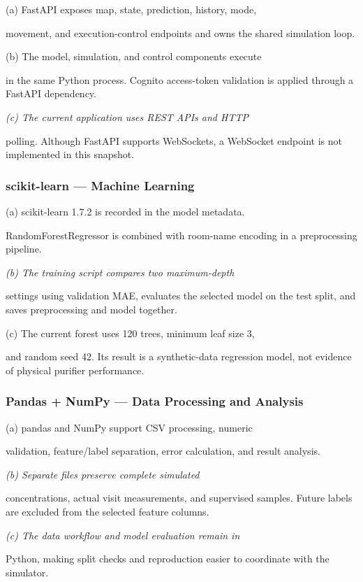 \documentclass[conference]{IEEEtran}
\begin{document}
(a) FastAPI exposes map, state, prediction, history, mode,

movement, and execution-control endpoints and owns the shared simulation loop.

(b) The model, simulation, and control components execute

in the same Python process. Cognito access-token validation is applied through a FastAPI dependency.

\emph{(c) The current application uses REST APIs and HTTP}

polling. Although FastAPI supports WebSockets, a WebSocket endpoint is not implemented in this snapshot.

\subsubsection{scikit-learn --- Machine Learning \cite{ref6,ref13}}

(a) scikit-learn 1.7.2 is recorded in the model metadata.

RandomForestRegressor is combined with room-name encoding in a preprocessing pipeline.

\emph{(b) The training script compares two maximum-depth}

settings using validation MAE, evaluates the selected model on the test split, and saves preprocessing and model together.

(c) The current forest uses 120 trees, minimum leaf size 3,

and random seed 42. Its result is a synthetic-data regression model, not evidence of physical purifier performance.

\subsubsection{Pandas + NumPy --- Data Processing and Analysis}

(a) pandas and NumPy support CSV processing, numeric

validation, feature/label separation, error calculation, and result analysis.

\emph{(b) Separate files preserve complete simulated}

concentrations, actual visit measurements, and supervised samples. Future labels are excluded from the selected feature columns.

\emph{(c) The data workflow and model evaluation remain in}

Python, making split checks and reproduction easier to coordinate with the simulator.
\end{document}
